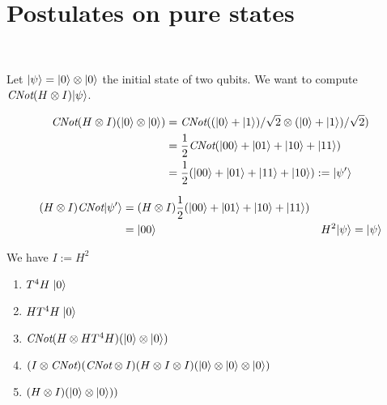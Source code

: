 \section{Postulates on pure states}

\exo[Evolutions]~

Let $| \psi \rangle = | 0 \rangle \otimes | 0 \rangle$ the initial state of two
qubits. We want to compute $\textit{CNot} (H \otimes I) | \psi \rangle$.

\begin{align*}
  \textit{CNot} (H \otimes I) (| 0 \rangle \otimes | 0 \rangle) &=
    \textit{CNot} ((| 0 \rangle + | 1 \rangle)/\sqrt 2 \otimes (| 0 \rangle + | 1 \rangle)/\sqrt 2) \\
    &= \frac 1 2 \textit{CNot} (| 00 \rangle + | 01 \rangle + | 10 \rangle + | 11 \rangle) \\
    &= \frac 1 2 (| 00 \rangle + | 01 \rangle + | 11 \rangle + | 10 \rangle) := | \psi' \rangle
\end{align*}

\begin{align*}
  (H\otimes I)\textit{CNot} | \psi' \rangle
  &= (H\otimes I) \frac 1 2 (| 00 \rangle + | 01 \rangle + | 10 \rangle + | 11 \rangle) \\
  &= | 00 \rangle & H^2| \psi \rangle = | \psi \rangle
\end{align*}

We have $I := H^2$

\begin{enumerate}
  \item $T^4H\; | 0 \rangle$
  \item $HT^4H\; | 0 \rangle$
  \item $\textit{CNot}(H \otimes HT^4H)(| 0 \rangle \otimes | 0 \rangle)$
  \item $(I \otimes \textit{CNot})(\textit{CNot} \otimes I)(H \otimes I \otimes I)
    (| 0 \rangle \otimes | 0 \rangle \otimes | 0 \rangle)$
  \item $(H \otimes I) (| 0 \rangle \otimes | 0 \rangle))$
\end{enumerate}

~

